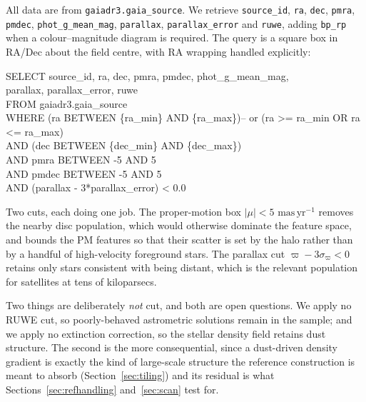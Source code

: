 \documentclass[11pt,a4paper]{article}
\newcommand{\unit}[1]{\ensuremath{\,\mathrm{#1}}}
\newcommand{\masyr}{\unit{mas\,yr^{-1}}}
\newcommand{\masyr}{\mathrm{mas\,yr^{-1}}}
\newenvironment{callout}%
  {\par\smallskip
   \setlength{\fboxrule}{0.6pt}\setlength{\fboxsep}{7pt}%
   \def\FrameCommand{\fcolorbox{calloutrule}{calloutbg}}%
   \MakeFramed{\advance\hsize-\width \FrameRestore}}%
  {\endMakeFramed\par\smallskip}
\begin{document}
All data are from \texttt{gaiadr3.gaia\_source}. We retrieve \texttt{source\_id}, \texttt{ra},
\texttt{dec}, \texttt{pmra}, \texttt{pmdec}, \texttt{phot\_g\_mean\_mag}, \texttt{parallax},
\texttt{parallax\_error} and \texttt{ruwe}, adding \texttt{bp\_rp} when a colour--magnitude
diagram is required. The query is a square box in RA/Dec about the field centre, with RA wrapping
handled explicitly:

\begin{callout}
\ttfamily\footnotesize
SELECT source\_id, ra, dec, pmra, pmdec, phot\_g\_mean\_mag,\\
\hspace*{2em} parallax, parallax\_error, ruwe\\
FROM gaiadr3.gaia\_source\\
WHERE (ra BETWEEN \{ra\_min\} AND \{ra\_max\})\hfill -- or (ra >= ra\_min OR ra <= ra\_max)\\
\hspace*{2em} AND (dec BETWEEN \{dec\_min\} AND \{dec\_max\})\\
\hspace*{2em} AND pmra\hspace*{0.6em} BETWEEN -5 AND 5\\
\hspace*{2em} AND pmdec BETWEEN -5 AND 5\\
\hspace*{2em} AND (parallax - 3*parallax\_error) < 0.0
\end{callout}

Two cuts, each doing one job. The proper-motion box $|\mu| < 5\,\masyr$ removes the nearby disc
population, which would otherwise dominate the feature space, and bounds the PM features so that
their scatter is set by the halo rather than by a handful of high-velocity foreground stars. The
parallax cut $\varpi - 3\sigma_\varpi < 0$ retains only stars consistent with being distant, which
is the relevant population for satellites at tens of kiloparsecs.

Two things are deliberately \emph{not} cut, and both are open questions. We apply no RUWE cut, so
poorly-behaved astrometric solutions remain in the sample; and we apply no extinction correction,
so the stellar density field retains dust structure. The second is the more consequential, since a
dust-driven density gradient is exactly the kind of large-scale structure the reference
construction is meant to absorb (Section~\ref{sec:tiling}) and its residual is what
Sections~\ref{sec:refhandling} and~\ref{sec:scan} test for.
\end{document}
